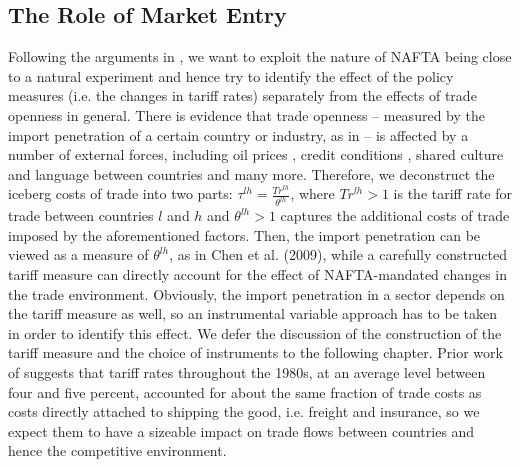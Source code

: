 \subsection{The Role of Market Entry}
Following the arguments in \citet{Trefler2004}, we want to exploit the nature of NAFTA being close to a natural experiment and hence try to identify the effect of the policy measures (i.e. the changes in tariff rates) separately from the effects of trade openness in general. There is evidence that trade openness -- measured by the import penetration of a certain country or industry, as in \citet{Chen2009} -- is affected by a number of external forces, including oil prices \citep{Kilian2009}, credit conditions \citep{Chor2012}, shared culture and language between countries and many more. Therefore, we deconstruct the iceberg costs of trade into two parts: $\tau^{lh}=\frac{Tr^{lh}}{\theta^{lh}}$, where $Tr^{lh}>1$ is the tariff rate for trade between countries $l$ and $h$ and $\theta^{lh}>1$ captures the additional costs of trade imposed by the aforementioned factors. Then, the import penetration can be viewed as a measure of $\theta^{lh}$, as in Chen et al. (2009), while a carefully constructed tariff measure can directly account for the effect of NAFTA-mandated changes in the trade environment. Obviously, the import penetration in a sector depends on the tariff measure as well, so an instrumental variable approach has to be taken in order to identify this effect. We defer the discussion of the construction of the tariff measure and the choice of instruments to the following chapter. Prior work of \citet{Bernard2006} suggests that tariff rates throughout the 1980s, at an average level between four and five percent, accounted for about the same fraction of trade costs as costs directly attached to shipping the good, i.e. freight and insurance, so we expect them to have a sizeable impact on trade flows between countries and hence the competitive environment. \vspace{0.5cm} \\


